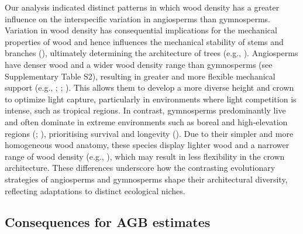 \documentclass[
  12pt,
  letterpaper,
  DIV=11,
  numbers=noendperiod]{scrartcl}
\begin{document}
Our analysis indicated distinct patterns in which wood density has a
greater influence on the interspecific variation in angiosperms than
gymnosperms. Variation in wood density has consequential implications
for the mechanical properties of wood and hence influences the
mechanical stability of stems and branches
(), ultimately
determining the architecture of trees (e.g.,
). Angiosperms have
denser wood and a wider wood density range than gymnosperms (see
Supplementary Table S2), resulting in greater and more flexible
mechanical support (e.g., ;
;
). This allows them to develop a
more diverse height and crown to optimize light capture, particularly in
environments where light competition is intense, such as tropical
regions. In contrast, gymnosperms predominantly live and often dominate
in extreme environments such as boreal and high-elevation regions
(;
), prioritising survival and
longevity (). Due to
their simpler and more homogeneous wood anatomy, these species display
lighter wood and a narrower range of wood density (e.g.,
), which may result in less
flexibility in the crown architecture. These differences underscore how
the contrasting evolutionary strategies of angiosperms and gymnosperms
shape their architectural diversity, reflecting adaptations to distinct
ecological niches.

\subsection{Consequences for AGB
estimates}\label{consequences-for-agb-estimates}
\end{document}
